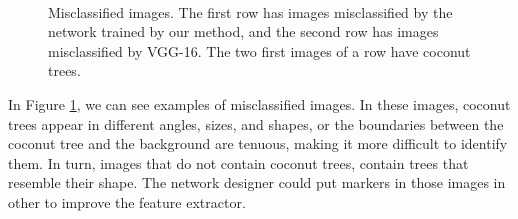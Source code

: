 \documentclass[a4paper,conference]{IEEEtran}
\begin{document}
\begin{figure}
  \centering
  ~
  ~
  ~
  ~
  ~
  \caption{Misclassified images. The first row has images misclassified by the network trained by our method, and the second row has images misclassified by VGG-16. The two first images of a row have coconut trees.}
  \label{fig:ex-classification}
\end{figure}

 In Figure \ref{fig:ex-classification}, we can see examples of misclassified images. In these images, coconut trees appear in different angles, sizes, and shapes, or the boundaries between the coconut tree and the background are tenuous, making it more difficult to identify them. In turn, images that do not contain coconut trees, contain trees that resemble their shape. The network designer could put markers in those images in other to improve the feature extractor.
\end{document}
